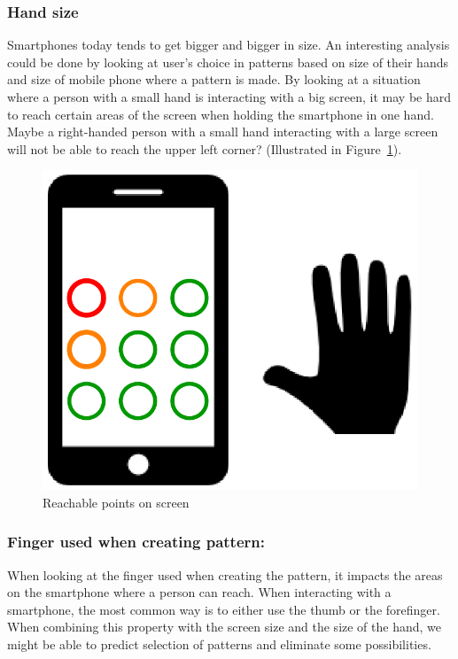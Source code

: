       \subsubsection*{Hand size} 
      Smartphones today tends to get bigger and bigger in size. An interesting analysis could be done by looking at user's choice in patterns based on size of their hands and size of mobile phone where a pattern is made. By looking at a situation where a person with a small hand is interacting with a big screen, it may be hard to reach certain areas of the screen when holding the smartphone in one hand. Maybe a right-handed person with a small hand interacting with a large screen will not be able to reach the upper left corner? (Illustrated in Figure~\ref{fig:reachablePoints}).

        \begin{figure}[H]
          \centering
          \includegraphics[scale=0.2]{pics/screenHand.png}
          \caption{Reachable points on screen}
          \label{fig:reachablePoints}
        \end{figure}

      \subsubsection*{Finger used when creating pattern:} When looking at the finger used when creating the pattern, it impacts the areas on the smartphone where a person can reach. When interacting with a smartphone, the most common way is to either use the thumb or the forefinger. When combining this property with the screen size and the size of the hand, we might be able to predict selection of patterns and eliminate some possibilities. 

